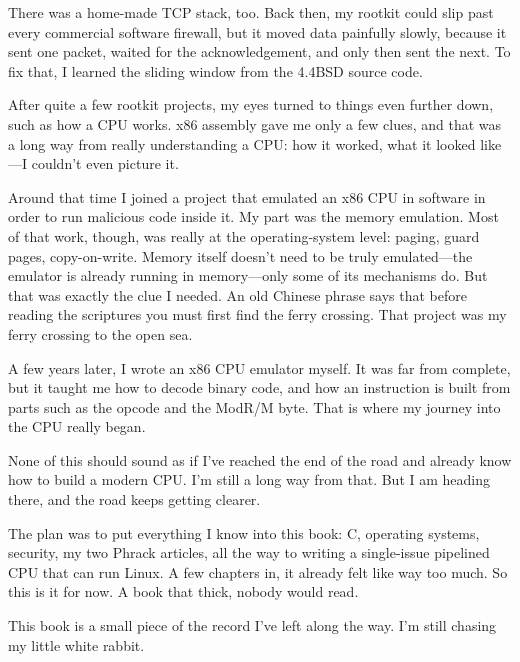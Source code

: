 There was a home-made TCP stack, too. Back then, my rootkit could slip past every commercial software firewall, but it moved data painfully slowly, because it sent one packet, waited for the acknowledgement, and only then sent the next. To fix that, I learned the sliding window from the 4.4BSD source code.

After quite a few rootkit projects, my eyes turned to things even further down, such as how a CPU works. x86 assembly gave me only a few clues, and that was a long way from really understanding a CPU: how it worked, what it looked like---I couldn't even picture it.

Around that time I joined a project that emulated an x86 CPU in software in order to run malicious code inside it. My part was the memory emulation. Most of that work, though, was really at the operating-system level: paging, guard pages, copy-on-write. Memory itself doesn't need to be truly emulated---the emulator is already running in memory---only some of its mechanisms do. But that was exactly the clue I needed. An old Chinese phrase says that before reading the scriptures you must first find the ferry crossing. That project was my ferry crossing to the open sea.

A few years later, I wrote an x86 CPU emulator myself. It was far from complete, but it taught me how to decode binary code, and how an instruction is built from parts such as the opcode and the ModR/M byte. That is where my journey into the CPU really began.

None of this should sound as if I've reached the end of the road and already know how to build a modern CPU. I'm still a long way from that. But I am heading there, and the road keeps getting clearer.

The plan was to put everything I know into this book: C, operating systems, security, my two Phrack articles, all the way to writing a single-issue pipelined CPU that can run Linux. A few chapters in, it already felt like way too much. So this is it for now. A book that thick, nobody would read.

This book is a small piece of the record I've left along the way. I'm still chasing my little white rabbit.
